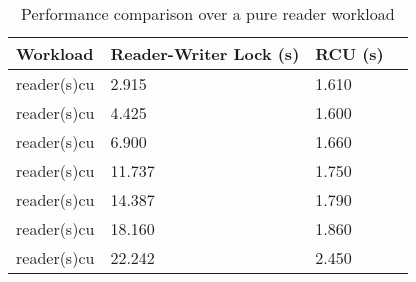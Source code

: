 \begin{table}[tph]
\begin{center}
\begin{tabular}{|l|l|l|l|}
\hline Workload &Reader-Writer Lock (s) & RCU (s) \\
\hline  reader(s)cu & 2.915 & 1.610\\
\hline  reader(s)cu & 4.425 & 1.600\\
\hline  reader(s)cu & 6.900 & 1.660\\
\hline  reader(s)cu & 11.737 & 1.750\\
\hline  reader(s)cu & 14.387 & 1.790\\
\hline  reader(s)cu & 18.160 & 1.860\\
\hline  reader(s)cu & 22.242 & 2.450\\
\hline
\end{tabular}
\end{center}
\label{tbl:writeintensive}
\caption{Performance comparison over a pure reader workload}
\end{table}
